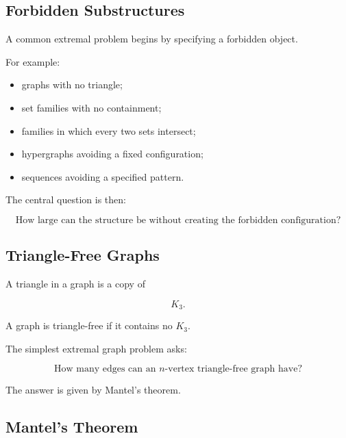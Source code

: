 \subsection{Forbidden Substructures}
\label{subsec:forbidden-substructures-extremal}

A common extremal problem begins by specifying a forbidden object.

For example:

\begin{itemize}
    \item graphs with no triangle;
    \item set families with no containment;
    \item families in which every two sets intersect;
    \item hypergraphs avoiding a fixed configuration;
    \item sequences avoiding a specified pattern.
\end{itemize}

The central question is then:

\[
\boxed{
\text{How large can the structure be without creating the forbidden
configuration?}
}
\]

\subsection{Triangle-Free Graphs}
\label{subsec:triangle-free-graphs}

A triangle in a graph is a copy of

\[
K_3.
\]

A graph is triangle-free if it contains no \(K_3\).

The simplest extremal graph problem asks:

\[
\boxed{
\text{How many edges can an }n\text{-vertex triangle-free graph have?}
}
\]

The answer is given by Mantel's theorem.

\subsection{Mantel's Theorem}
\label{subsec:mantels-theorem}

